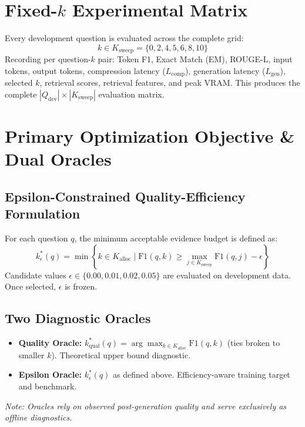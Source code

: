 \documentclass[11pt,a4paper]{article}
\begin{document}
\section{Fixed-\texorpdfstring{$k$}{k} Experimental Matrix}
Every development question is evaluated across the complete grid:
\begin{equation}
k \in K_{\text{sweep}} = \{0, 2, 4, 5, 6, 8, 10\}
\end{equation}
Recording per question-$k$ pair: Token F1, Exact Match (EM), ROUGE-L, input tokens, output tokens, compression latency ($L_{\text{comp}}$), generation latency ($L_{\text{gen}}$), selected $k$, retrieval scores, retrieval features, and peak VRAM. This produces the complete $|Q_{\text{dev}}| \times |K_{\text{sweep}}|$ evaluation matrix.

\section{Primary Optimization Objective \& Dual Oracles}
\subsection{Epsilon-Constrained Quality-Efficiency Formulation}
For each question $q$, the minimum acceptable evidence budget is defined as:
\begin{equation}
k^*_\epsilon(q) = \min \left\{ k \in K_{\text{alloc}} \;\Big|\; \text{F1}(q, k) \ge \max_{j \in K_{\text{sweep}}} \text{F1}(q, j) - \epsilon \right\}
\end{equation}
Candidate values $\epsilon \in \{0.00, 0.01, 0.02, 0.05\}$ are evaluated on development data. Once selected, $\epsilon$ is frozen.

\subsection{Two Diagnostic Oracles}
\begin{itemize}
    \item \textbf{Quality Oracle:} $k^*_{\text{qual}}(q) = \arg\max_{k \in K_{\text{alloc}}} \text{F1}(q, k)$ (ties broken to smaller $k$). Theoretical upper bound diagnostic.
    \item \textbf{Epsilon Oracle:} $k^*_\epsilon(q)$ as defined above. Efficiency-aware training target and benchmark.
\end{itemize}
\textit{Note: Oracles rely on observed post-generation quality and serve exclusively as offline diagnostics.}
\end{document}
